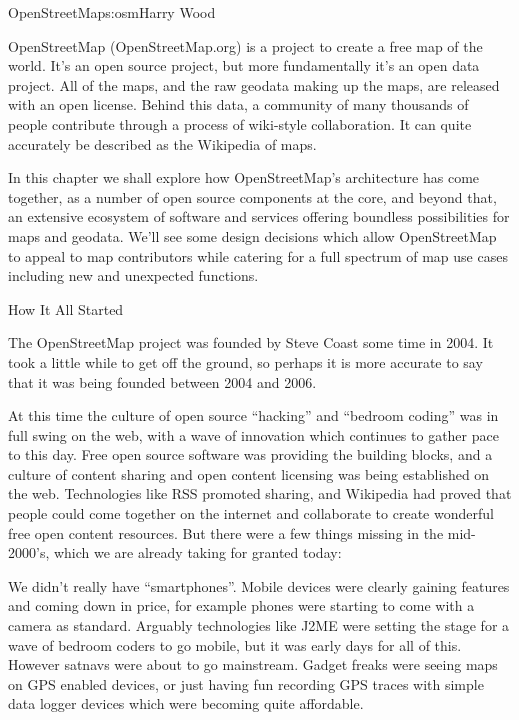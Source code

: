 \begin{aosachapter}{OpenStreetMap}{s:osm}{Harry Wood}

OpenStreetMap (OpenStreetMap.org) is a project to create a free map of
the world. It's an open source project, but more fundamentally it's an
open data project. All of the maps, and the raw geodata making up the
maps, are released with an open license. Behind this data, a community
of many thousands of people contribute through a process of wiki-style
collaboration. It can quite accurately be described as the Wikipedia
of maps.

In this chapter we shall explore how OpenStreetMap's architecture has
come together, as a number of open source components at the core, and
beyond that, an extensive ecosystem of software and services offering
boundless possibilities for maps and geodata. We'll see some design
decisions which allow OpenStreetMap to appeal to map contributors
while catering for a full spectrum of map use cases including new and
unexpected functions.

\begin{aosasect1}{How It All Started}

The OpenStreetMap project was founded by Steve Coast some time in
2004. It took a little while to get off the ground, so perhaps it is
more accurate to say that it was being founded between 2004 and 2006.

At this time the culture of open source ``hacking'' and ``bedroom
coding'' was in full swing on the web, with a wave of innovation which
continues to gather pace to this day. Free open source software was
providing the building blocks, and a culture of content sharing and
open content licensing was being established on the web. Technologies
like RSS promoted sharing, and Wikipedia had proved that people could
come together on the internet and collaborate to create wonderful free
open content resources. But there were a few things missing in the
mid-2000's, which we are already taking for granted today:

We didn't really have ``smartphones''. Mobile devices were clearly
gaining features and coming down in price, for example phones were
starting to come with a camera as standard. Arguably technologies like
J2ME were setting the stage for a wave of bedroom coders to go mobile,
but it was early days for all of this. However satnavs were about to
go mainstream. Gadget freaks were seeing maps on GPS enabled devices,
or just having fun recording GPS traces with simple data logger
devices which were becoming quite affordable.


\end{aosasect1}
\end{aosachapter}
